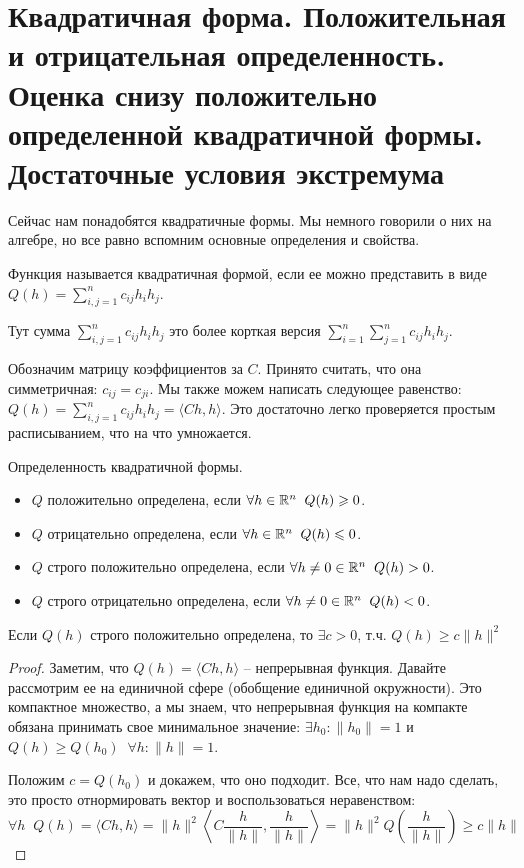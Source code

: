 \section{Квадратичная форма. Положительная и отрицательная определенность. Оценка снизу положительно определенной квадратичной формы. Достаточные условия экстремума}
Сейчас нам понадобятся квадратичные формы.
Мы немного говорили о них на алгебре, но все равно вспомним основные определения и свойства.
\begin{conj}
    Функция называется квадратичная формой, если ее можно представить в виде $Q(h) = \sum\limits_{i, j = 1}^n c_{ij}h_ih_j$.
\end{conj}
Тут сумма $\sum\limits_{i, j = 1}^n c_{ij}h_ih_j$ это более корткая версия $\sum\limits_{i=1}^n\sum\limits_{j=1}^n c_{ij}h_ih_j$.

Обозначим матрицу коэффициентов за $C$.
Принято считать, что она симметричная: $c_{ij} = c_{ji}$.
Мы также можем написать следующее равенство: $Q(h) = \sum\limits_{i, j = 1}^n c_{ij}h_ih_j = \langle Ch, h \rangle$.
Это достаточно легко проверяется простым расписыванием, что на что умножается.

\begin{conj} Определенность квадратичной формы.

    \begin{itemize}
        \item $Q$ положительно определена, если $\forall h \in \mathbb{R}^n \;\; Q(h) \geqslant 0$.
        \item $Q$ отрицательно определена, если $\forall h \in \mathbb{R}^n \;\; Q(h) \leqslant 0$.
        \item $Q$ строго положительно определена, если $\forall h \neq 0 \in \mathbb{R}^n \;\; Q(h) > 0$.
        \item $Q$ строго отрицательно определена, если $\forall h \neq 0 \in \mathbb{R}^n \;\; Q(h) < 0$. 
    \end{itemize}
\end{conj}

\vspace*{5mm}

\begin{lemma}
    Если $Q(h)$ строго положительно определена, то $\exists c > 0$, т.ч. $Q(h) \geqslant c\|h\|^2 $
\end{lemma}
\begin{proof}
    Заметим, что $Q(h) = \langle Ch, h \rangle$ -- непрерывная функция.
    Давайте рассмотрим ее на единичной сфере (обобщение единичной окружности).
    Это компактное множество, а мы знаем, что непрерывная функция на компакте обязана принимать свое минимальное значение: $\exists h_0 : \|h_0\| = 1$ и $Q(h) \geqslant Q(h_0) \;\; \forall h : \|h\| = 1$.
    
    Положим $c = Q(h_0)$ и докажем, что оно подходит.
    Все, что нам надо сделать, это просто отнормировать вектор и воспользоваться неравенством: \[ \forall h \;\; Q(h) = \langle Ch, h \rangle = \|h\|^2 \left\langle C \frac{h}{\|h\|}, \frac{h}{\|h\|} \right\rangle = \|h\|^2Q\left(\frac{h}{\|h\|}\right) \geqslant c\|h\| \]
\end{proof}

